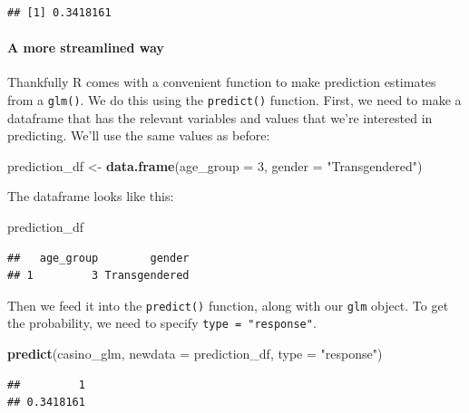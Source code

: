 \documentclass[
]{book}
\newenvironment{Shaded}{\begin{snugshade}}{\end{snugshade}}
\newcommand{\DataTypeTok}[1]{\textcolor[rgb]{0.13,0.29,0.53}{#1}}
\newcommand{\DecValTok}[1]{\textcolor[rgb]{0.00,0.00,0.81}{#1}}
\newcommand{\KeywordTok}[1]{\textcolor[rgb]{0.13,0.29,0.53}{\textbf{#1}}}
\newcommand{\NormalTok}[1]{#1}
\newcommand{\StringTok}[1]{\textcolor[rgb]{0.31,0.60,0.02}{#1}}
\begin{document}
\begin{verbatim}
## [1] 0.3418161
\end{verbatim}

\hypertarget{a-more-streamlined-way}{%
\paragraph{A more streamlined way}\label{a-more-streamlined-way}}

Thankfully R comes with a convenient function to make prediction estimates from a \texttt{glm()}. We do this using the \texttt{predict()} function. First, we need to make a dataframe that has the relevant variables and values that we're interested in predicting. We'll use the same values as before:

\begin{Shaded}
\begin{Highlighting}[]
\NormalTok{prediction_df <-}\StringTok{ }\KeywordTok{data.frame}\NormalTok{(}\DataTypeTok{age_group =} \DecValTok{3}\NormalTok{, }\DataTypeTok{gender =} \StringTok{"Transgendered"}\NormalTok{)}
\end{Highlighting}
\end{Shaded}

The dataframe looks like this:

\begin{Shaded}
\begin{Highlighting}[]
\NormalTok{prediction_df}
\end{Highlighting}
\end{Shaded}

\begin{verbatim}
##   age_group        gender
## 1         3 Transgendered
\end{verbatim}

Then we feed it into the \texttt{predict()} function, along with our \texttt{glm} object. To get the probability, we need to specify \texttt{type\ =\ "response"}.

\begin{Shaded}
\begin{Highlighting}[]
\KeywordTok{predict}\NormalTok{(casino_glm, }\DataTypeTok{newdata =}\NormalTok{ prediction_df, }\DataTypeTok{type =} \StringTok{"response"}\NormalTok{)}
\end{Highlighting}
\end{Shaded}

\begin{verbatim}
##         1 
## 0.3418161
\end{verbatim}
\end{document}
